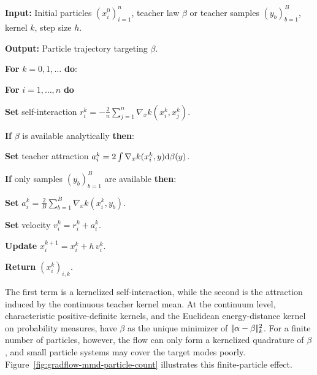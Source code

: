 \begin{alg}\label{alg:mmd-particle-flow}
\textbf{Input:} Initial particles $(x_i^0)_{i=1}^n$, teacher law $\beta$ or teacher samples $(y_b)_{b=1}^B$, kernel $k$, step size $h$.

\textbf{Output:} Particle trajectory targeting $\beta$.

\textbf{For} $k=0,1,\ldots$ \textbf{do}:
\begin{algblock}

\textbf{For} $i=1,\ldots,n$ \textbf{do}
\begin{algblock}
\textbf{Set} self-interaction \(r_i^k=-\frac{2}{n}\sum_{j=1}^n\nabla_x k(x_i^k,x_j^k)\).

\textbf{If} $\beta$ is available analytically \textbf{then}:
\begin{algblock}

\textbf{Set} teacher attraction \(a_i^k=2\int\nabla_x k(x_i^k,y)\mathrm{d}\beta(y)\).

\end{algblock}
\textbf{If} only samples $(y_b)_{b=1}^B$ are available \textbf{then}:
\begin{algblock}

\textbf{Set} \(a_i^k=\frac{2}{B}\sum_{b=1}^B\nabla_x k(x_i^k,y_b)\).

\end{algblock}
\textbf{Set} velocity \(v_i^k=r_i^k+a_i^k\).

\textbf{Update}
\(x_i^{k+1}=x_i^k+h\,v_i^k.\)
\end{algblock}
\end{algblock}
\algreturnskip
\textbf{Return} $(x_i^k)_{i,k}$.
\end{alg}

	       The first term is a kernelized self-interaction, while the second is the attraction induced by the continuous teacher kernel mean. At the continuum level, characteristic positive-definite kernels, and the Euclidean energy-distance kernel on probability measures, have $\beta$ as the unique minimizer of $|\!| \alpha-\beta |\!|_k^2$. For a finite number of particles, however, the flow can only form a kernelized quadrature of $\beta$, and small particle systems may cover the target modes poorly. Figure~\ref{fig:gradflow-mmd-particle-count} illustrates this finite-particle effect.

